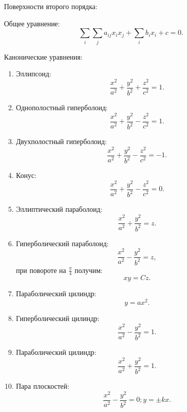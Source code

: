 	\begin{appendix} Поверхности второго порядка:
	
	Общее уравнение:
	\[ \sum\limits_i \sum\limits_j a_{ij}x_ix_j + \sum\limits_i b_ix_i + c = 0. \]
	
	Канонические уравнения:
	\begin{enumerate}
	\item Эллипсоид:
	\[ \frac{x^2}{a^2} + \frac{y^2}{b^2} + \frac{z^2}{c^2} = 1. \]
	
	\item Однополостный гиперболоид:
	\[ \frac{x^2}{a^2} + \frac{y^2}{b^2} - \frac{z^2}{c^2} = 1. \]
	
	\item Двухполостный гиперболоид:
	\[ \frac{x^2}{a^2} + \frac{y^2}{b^2} - \frac{z^2}{c^2} = -1. \]
	
	\item Конус:
	\[ \frac{x^2}{a^2} + \frac{y^2}{b^2} - \frac{z^2}{c^2} = 0. \]
	
	\item Эллиптический параболоид:
	\[ \frac{x^2}{a^2} + \frac{y^2}{b^2} = z. \]
	
	\item Гиперболический параболоид:
	\[ \frac{x^2}{a^2} - \frac{y^2}{b^2} = z, \]
	при повороте на \( \frac{\pi}{4} \) получим:
	\[ xy = Cz. \]
	
	\item Параболический цилиндр:
	\[ y = ax^2. \]
	
	\item Гиперболический цилиндр:
	\[ \frac{x^2}{a^2} - \frac{y^2}{b^2} = 1. \]
	
	\item Параболический цилиндр:
	\[ \frac{x^2}{a^2} + \frac{y^2}{b^2} = 1. \]
	
	\item Пара плоскостей:
	\[ \frac{x^2}{a^2} - \frac{y^2}{b^2} = 0; y = \pm kx. \]
	\end{enumerate}
	\end{appendix}
